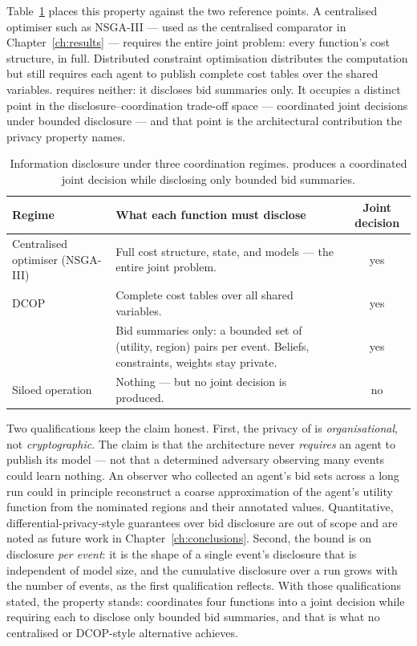 Table~\ref{tab:disclosure} places this property against the two
reference points. A centralised optimiser such as NSGA-III
\cite{deb2014nsga3} --- used as the centralised comparator in
Chapter~\ref{ch:results} --- requires the entire joint problem: every
function's cost structure, in full. Distributed constraint optimisation
\cite{modi2005adopt,fioretto2018dcop} distributes the computation but
still requires each agent to publish complete cost tables over the
shared variables. \NEXUS{} requires neither: it discloses bid summaries
only. It occupies a distinct point in the disclosure--coordination
trade-off space --- coordinated joint decisions under bounded
disclosure --- and that point is the architectural contribution the
privacy property names.

\begin{table}[ht]
\centering
\caption{Information disclosure under three coordination regimes.
\NEXUS{} produces a coordinated joint decision while disclosing only
bounded bid summaries.}
\label{tab:disclosure}
\small
\begin{tabularx}{\textwidth}{@{}l X c@{}}
\toprule
\textbf{Regime} & \textbf{What each function must disclose} & \textbf{Joint decision} \\
\midrule
Centralised optimiser (NSGA-III) &
  Full cost structure, state, and models --- the entire joint problem. & yes \\
\addlinespace
DCOP &
  Complete cost tables over all shared variables. & yes \\
\addlinespace
\textbf{\NEXUS{}} &
  Bid summaries only: a bounded set of (utility, region) pairs per
  event. Beliefs, constraints, weights stay private. & yes \\
\addlinespace
Siloed operation &
  Nothing --- but no joint decision is produced. & no \\
\bottomrule
\end{tabularx}
\end{table}

Two qualifications keep the claim honest. First, the privacy of
\NEXUS{} is \emph{organisational}, not \emph{cryptographic}. The claim
is that the architecture never \emph{requires} an agent to publish its
model --- not that a determined adversary observing many events could
learn nothing. An observer who collected an agent's bid sets across a
long run could in principle reconstruct a coarse approximation of the
agent's utility function from the nominated regions and their annotated
values. Quantitative, differential-privacy-style guarantees over bid
disclosure are out of scope and are noted as future work in
Chapter~\ref{ch:conclusions}. Second, the bound is on disclosure
\emph{per event}: it is the shape of a single event's disclosure that is
independent of model size, and the cumulative disclosure over a run
grows with the number of events, as the first qualification reflects.
With those qualifications stated, the property stands: \NEXUS{}
coordinates four functions into a joint decision while requiring each
to disclose only bounded bid summaries, and that is what no centralised
or DCOP-style alternative achieves.


